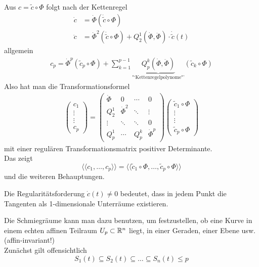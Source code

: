\begin{beweis}
 Aus \(c = \tilde c \circ \Phi\) folgt nach der Kettenregel
 \begin{align*}
  \dot c &= \dot \Phi \left(\dot{\tilde c} \circ \Phi \right)\\
  \ddot c &= \dot \Phi^2 \left( \ddot{\tilde c} \circ \Phi \right) + Q_2^1 \left( \dot \Phi, \ddot \Phi \right) \cdot \dot {\tilde c}(t)
 \end{align*}
allgemein 
\begin{align*}
 c_p= \dot \Phi^p (\tilde c_p \circ \Phi) + \sum_{k=1}^{p-1} \underbrace{Q_p^k \left( \dot \Phi, \ddot \Phi \right)}_{\text{"`Kettenregelpolynome"'}} \left( \tilde c_k \circ \Phi \right)
\end{align*}
Also hat man die Transformationsformel
\begin{align*}
 \begin{pmatrix}
  c_1 \\
  \vdots \\
  \vdots \\
  c_p
 \end{pmatrix} = \begin{pmatrix}
		  \dot \Phi &0 & \cdots & 0 \\
		  Q_2^1& \dot \Phi^2 & \ddots  & \vdots \\
		  \vdots & \ddots & \ddots &0 \\
		  Q_p^1 & \cdots & Q_p^k & \dot \Phi^p
		 \end{pmatrix} \begin{pmatrix}
				\tilde c_1 \circ \Phi \\
				\vdots \\
				\vdots \\
				\tilde c_p \circ \Phi
			       \end{pmatrix}
\end{align*}
mit einer regulären Transformationsmatrix positiver Determinante. \\
Das zeigt 
\[
 \langle \langle c_1, \dots, c_p \rangle \rangle = \langle \langle \tilde c_1 \circ \Phi, \dots, \tilde c_p \circ \Phi \rangle \rangle
\]
und die weiteren Behauptungen.
\end{beweis}

\begin{bemerkung}
 Die Regularitätsforderung \(\dot c(t) \ne 0\) bedeutet, dass in jedem Punkt die Tangenten als 1-dimensionale Unterräume existieren.
\end{bemerkung}

Die Schmiegräume kann man dazu benutzen, um festzustellen, ob eine Kurve in einem echten affinen Teilraum \(U_p \subset \mathbb{R}^n\) liegt, in einer Geraden, einer Ebene usw. (affin-invariant!) \\
Zunächst gilt offensichtlich 
\[
 S_1(t) \subseteq S_2(t) \subseteq \dots \subseteq S_n(t) \le p
\]

